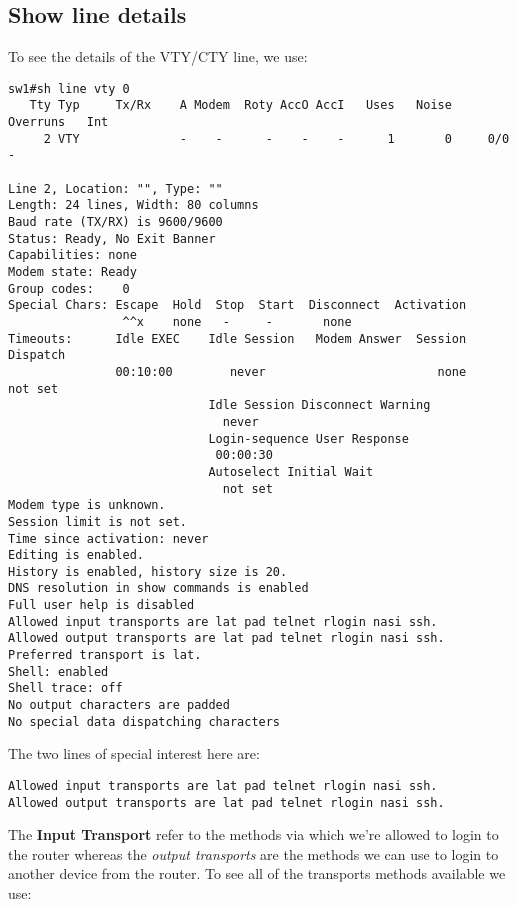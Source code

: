 \subsection{Show line details}
To see the details of the VTY/CTY line, we use:

\vspace{-15pt}
\begin{verbatim}
sw1#sh line vty 0
   Tty Typ     Tx/Rx    A Modem  Roty AccO AccI   Uses   Noise  Overruns   Int
     2 VTY              -    -      -    -    -      1       0     0/0       -

Line 2, Location: "", Type: ""
Length: 24 lines, Width: 80 columns
Baud rate (TX/RX) is 9600/9600
Status: Ready, No Exit Banner
Capabilities: none
Modem state: Ready
Group codes:    0
Special Chars: Escape  Hold  Stop  Start  Disconnect  Activation
                ^^x    none   -     -       none
Timeouts:      Idle EXEC    Idle Session   Modem Answer  Session   Dispatch
               00:10:00        never                        none     not set
                            Idle Session Disconnect Warning
                              never
                            Login-sequence User Response
                             00:00:30
                            Autoselect Initial Wait
                              not set
Modem type is unknown.
Session limit is not set.
Time since activation: never
Editing is enabled.
History is enabled, history size is 20.
DNS resolution in show commands is enabled
Full user help is disabled
Allowed input transports are lat pad telnet rlogin nasi ssh.
Allowed output transports are lat pad telnet rlogin nasi ssh.
Preferred transport is lat.
Shell: enabled
Shell trace: off
No output characters are padded
No special data dispatching characters
\end{verbatim}
\vspace{-10pt}

\noindent
The two lines of special interest here are: 

\vspace{-15pt}
\begin{verbatim}
Allowed input transports are lat pad telnet rlogin nasi ssh.
Allowed output transports are lat pad telnet rlogin nasi ssh.
\end{verbatim}
\vspace{-10pt}

\noindent
The \textbf{Input Transport} refer to the methods via which we're allowed to login to the router whereas the \textit{output transports} are the methods we can use to login to another device from the router. To see all of the transports methods available we use:

